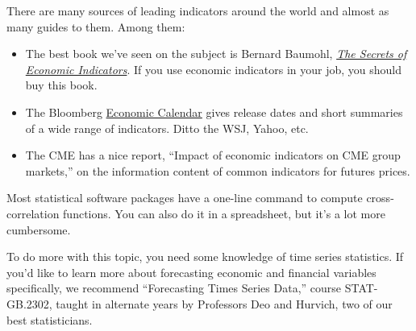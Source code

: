 There are many sources of leading indicators around the world
and almost as many guides to them.
Among them:
%
\begin{itemize}

\item The best book we've seen on the subject is
Bernard Baumohl,
\href{http://www.amazon.com/The-Secrets-Economic-Indicators-Opportunities/dp/0132932075/}
{\it The Secrets of Economic Indicators\/}.
If you use economic indicators in your job, you should buy this book.

\item The Bloomberg
\href{http://www.bloomberg.com/markets/ecalendar/index.html}
{Economic Calendar}
gives release dates and short summaries of a wide range of indicators.
Ditto the WSJ, Yahoo, etc.


\item The CME has a nice report,
``Impact of economic indicators on CME group markets,''
on the information content of common indicators for futures prices.


\end{itemize}
%
Most statistical software packages have a one-line command to compute
cross-correlation functions.
You can also do it in a spreadsheet, but it's a lot more cumbersome.

To do more with this topic, you need some knowledge of time series statistics.
If you'd like to learn more about forecasting economic and
financial variables specifically,
we recommend ``Forecasting Times Series Data,'' course STAT-GB.2302,
taught in alternate years by Professors Deo and Hurvich, two of our best statisticians.

